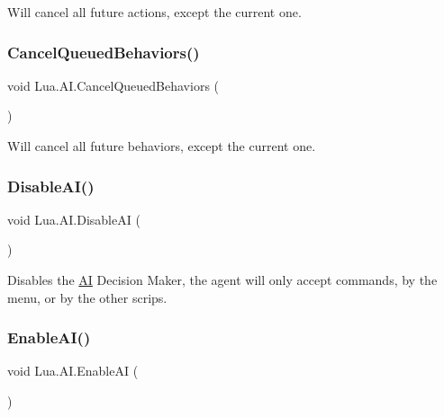 Will cancel all future actions, except the current one. 

\mbox{\label{class_lua_1_1_a_i_a1c8effd2d78be1f69eb84e3db9b02b0f}} 
\subsubsection{\texorpdfstring{CancelQueuedBehaviors()}{CancelQueuedBehaviors()}}
{\footnotesize\ttfamily void Lua.\+A\+I.\+Cancel\+Queued\+Behaviors (\begin{DoxyParamCaption}{ }\end{DoxyParamCaption})}



Will cancel all future behaviors, except the current one. 

\mbox{\label{class_lua_1_1_a_i_af829734ccdb97c9440ebabba2868ee05}} 
\subsubsection{\texorpdfstring{DisableAI()}{DisableAI()}}
{\footnotesize\ttfamily void Lua.\+A\+I.\+Disable\+AI (\begin{DoxyParamCaption}{ }\end{DoxyParamCaption})}



Disables the \mbox{\hyperlink{class_lua_1_1_a_i}{AI}} Decision Maker, the agent will only accept commands, by the menu, or by the other scrips. 

\mbox{\label{class_lua_1_1_a_i_abdd5b0d3983359ec46851cd99bdd2cb2}} 
\subsubsection{\texorpdfstring{EnableAI()}{EnableAI()}}
{\footnotesize\ttfamily void Lua.\+A\+I.\+Enable\+AI (\begin{DoxyParamCaption}{ }\end{DoxyParamCaption})}



